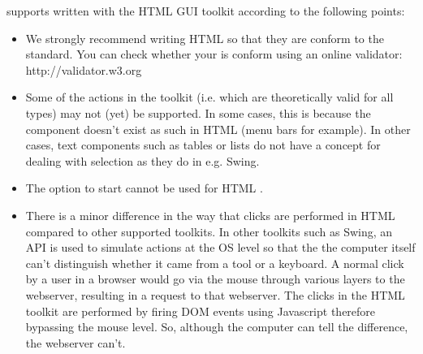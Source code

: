 \app{} supports \gdauts{} written with the HTML GUI toolkit according to the following points:

\begin{itemize}
\item We strongly recommend writing HTML \gdauts{} so that they are conform to the  standard. You can check whether your \gdaut{} is  conform using an online validator: http://validator.w3.org
\item Some of the \app{} actions in the  toolkit (i.e. which are theoretically valid for all \gdaut{} types) may not (yet) be supported. In some cases, this is because the component doesn't exist as such in HTML \gdauts{} (menu bars for example). In other cases, text components such as tables or lists do not have a concept for dealing with selection as they do in e.g. Swing. 
\item The  option to start \gdauts{}  cannot be used for HTML \gdauts{}. 
\item There is a minor difference in the way that clicks are performed in HTML compared to other supported toolkits. In other toolkits such as Swing, an API is used to simulate actions at the OS level so that the the computer itself can't distinguish whether it came from a tool or a keyboard. A normal click by a user in a browser would go via the mouse through various layers to the webserver, resulting in a request to that webserver. The clicks in the HTML toolkit are performed by firing DOM events using Javascript therefore bypassing the mouse level. So, although the computer can tell the difference, the webserver can't. 
\end{itemize}
